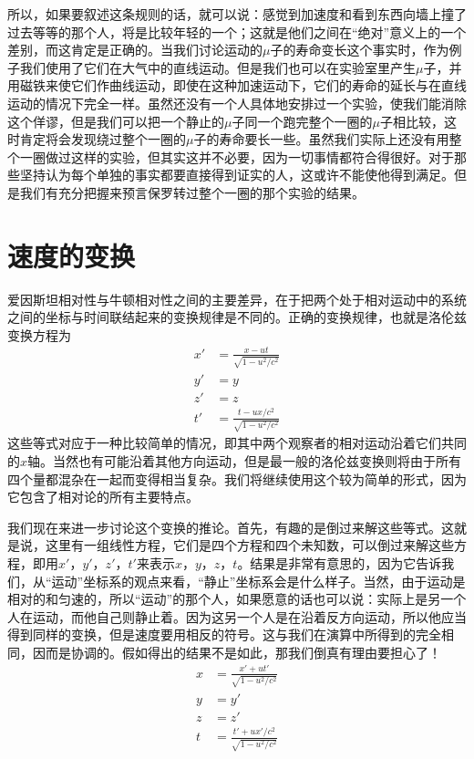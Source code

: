 所以，如果要叙述这条规则的话，就可以说：感觉到加速度和看到东西向墙上撞了过去等等的那个人，将是比较年轻的一个；这就是他们之间在“绝对”意义上的一个差别，而这肯定是正确的。当我们讨论运动的$\mu$子的寿命变长这个事实时，作为例子我们使用了它们在大气中的直线运动。但是我们也可以在实验室里产生$\mu$子，并用磁铁来使它们作曲线运动，即使在这种加速运动下，它们的寿命的延长与在直线运动的情况下完全一样。虽然还没有一个人具体地安排过一个实验，使我们能消除这个佯谬，但是我们可以把一个静止的$\mu$子同一个跑完整个一圈的$\mu$子相比较，这时肯定将会发现绕过整个一圈的$\mu$子的寿命要长一些。虽然我们实际上还没有用整个一圈做过这样的实验，但其实这并不必要，因为一切事情都符合得很好。对于那些坚持认为每个单独的事实都要直接得到证实的人，这或许不能使他得到满足。但是我们有充分把握来预言保罗转过整个一圈的那个实验的结果。

\section{速度的变换}

爱因斯坦相对性与牛顿相对性之间的主要差异，在于把两个处于相对运动中的系统之间的坐标与时间联结起来的变换规律是不同的。正确的变换规律，也就是洛伦兹变换方程为
\begin{equation}
    \label{Eq:I:16:1}
    \begin{aligned}
        x'&=\frac{x-ut}{\sqrt{1-u^2/c^2}} \\
        y'&=y \\
        z'&=z \\
        t'&=\frac{t-ux/c^2}{\sqrt{1-u^2/c^2}}
    \end{aligned}
\end{equation}
这些等式对应于一种比较简单的情况，即其中两个观察者的相对运动沿着它们共同的$x$轴。当然也有可能沿着其他方向运动，但是最一般的洛伦兹变换则将由于所有四个量都混杂在一起而变得相当复杂。我们将继续使用这个较为简单的形式，因为它包含了相对论的所有主要特点。

我们现在来进一步讨论这个变换的推论。首先，有趣的是倒过来解这些等式。这就是说，这里有一组线性方程，它们是四个方程和四个未知数，可以倒过来解这些方程，即用$x'$，$y'$，$z'$，$t'$来表示$x$，$y$，$z$，$t$。结果是非常有意思的，因为它告诉我们，从“运动”坐标系的观点来看，“静止”坐标系会是什么样子。当然，由于运动是相对的和匀速的，所以“运动”的那个人，如果愿意的话也可以说：实际上是另一个人在运动，而他自己则静止着。因为这另一个人是在沿着反方向运动，所以他应当得到同样的变换，但是速度要用相反的符号。这与我们在演算中所得到的完全相同，因而是协调的。假如得出的结果不是如此，那我们倒真有理由要担心了！
\begin{equation}
    \label{Eq:I:16:2}
    \begin{aligned}
        x&=\frac{x'+ut'}{\sqrt{1-u^2/c^2}} \\
        y&=y' \\
        z&=z' \\
        t&=\frac{t'+ux'/c^2}{\sqrt{1-u^2/c^2}}
    \end{aligned}
\end{equation}

